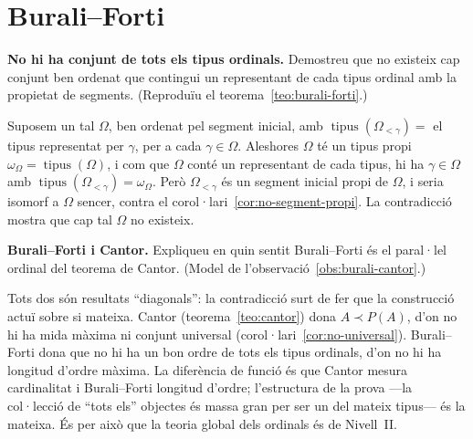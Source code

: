 \section{Burali--Forti}\label{prac:burali-forti}

\begin{exercici}
\textbf{No hi ha conjunt de tots els tipus ordinals.} Demostreu que no existeix cap conjunt ben ordenat que contingui un representant de cada tipus ordinal amb la propietat de segments. (Reproduïu el teorema~\ref{teo:burali-forti}.)
\end{exercici}
\begin{solucio}
Suposem un tal \(\Omega\), ben ordenat pel segment inicial, amb \(\operatorname{tipus}(\Omega_{<\gamma})=\) el tipus representat per \(\gamma\), per a cada \(\gamma\in\Omega\). Aleshores \(\Omega\) té un tipus propi \(\omega_\Omega=\operatorname{tipus}(\Omega)\), i com que \(\Omega\) conté un representant de cada tipus, hi ha \(\gamma\in\Omega\) amb \(\operatorname{tipus}(\Omega_{<\gamma})=\omega_\Omega\). Però \(\Omega_{<\gamma}\) és un segment inicial propi de \(\Omega\), i seria isomorf a \(\Omega\) sencer, contra el corol·lari~\ref{cor:no-segment-propi}. La contradicció mostra que cap tal \(\Omega\) no existeix.
\end{solucio}

\begin{exercici}
\textbf{Burali--Forti i Cantor.} Expliqueu en quin sentit Burali--Forti és el paral·lel ordinal del teorema de Cantor. (Model de l'observació~\ref{obs:burali-cantor}.)
\end{exercici}
\begin{solucio}
Tots dos són resultats \enquote{diagonals}: la contradicció surt de fer que la construcció actuï sobre si mateixa. Cantor (teorema~\ref{teo:cantor}) dona \(A\prec P(A)\), d'on no hi ha mida màxima ni conjunt universal (corol·lari~\ref{cor:no-universal}). Burali--Forti dona que no hi ha un bon ordre de tots els tipus ordinals, d'on no hi ha longitud d'ordre màxima. La diferència de funció és que Cantor mesura cardinalitat i Burali--Forti longitud d'ordre; l'estructura de la prova ---la col·lecció de \enquote{tots els} objectes és massa gran per ser un del mateix tipus--- és la mateixa. És per això que la teoria global dels ordinals és de Nivell~II.
\end{solucio}
